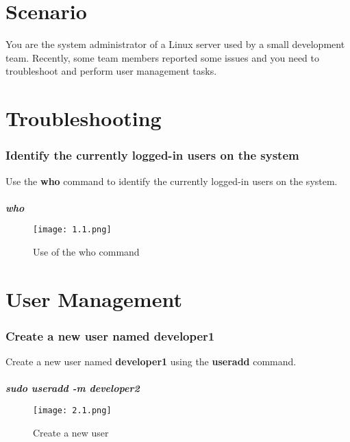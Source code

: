 \documentclass[12pt]{article}
\begin{document}

\newpage
\tableofcontents
\newpage

\section*{Scenario}
You are the system administrator of a Linux server used by a small development team. Recently, some team members reported some issues and you need to troubleshoot and perform user management tasks.
\section{Troubleshooting}

\subsubsection{Identify the currently logged-in users on the system}
Use the \textbf{who} command to identify the currently logged-in users on the system.
\\ \\ \textbf{\textit {who}}

\begin{figure}[h]
    \centering
    \texttt{[image: 1.1.png]}
    \caption{Use of the who command}
    \label{fig:kaniz1}
\end{figure}
\section{User Management}

\subsubsection{Create a new user named developer1}
Create a new user named \textbf{developer1} using the \textbf{useradd} command.
\\ \\ \textbf{\textit {sudo useradd -m developer2}}

\begin{figure}[h]
    \centering
    \texttt{[image: 2.1.png]}
    \caption{Create a new user}
    \label{fig:kaniz2}
\end{figure}
\end{document}

